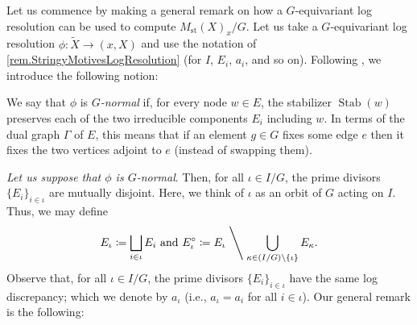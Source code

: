 \documentclass[12pt]{amsart}
\theoremstyle{plain}   %
\theoremstyle{definition}    %
\theoremstyle{remark}    %
\numberwithin{equation}{theorem}
\DeclareMathOperator{\Stab}{{Stab}}
\begin{document}
Let us commence by making a general remark on how a $G$-equivariant log resolution can be used to compute $M_{\mathrm{st}}(X)_x/G$.
Let us take a $G$-equivariant log resolution $\phi\colon \tilde{X}\to (x,X)$ and use the notation of \autoref{rem.StringyMotivesLogResolution} (for $I$, $E_i$, $a_i$, and so on). Following \cite[Definition 5.1]{batyrevNonArchimedeanIntegralsStringy1999}, we introduce the following notion:
\begin{definition}
We say that $\phi$ is \emph{$G$-normal} if, for every node $w\in E$,
the stabilizer $\Stab(w)$ preserves each of the two irreducible components
$E_{i}$ including $w$. In terms of the dual graph $\Gamma$ of $E$, this means that if an
element $g\in G$ fixes some edge $e$ then it fixes the two vertices adjoint to $e$ (instead of swapping them). 
\end{definition}

\emph{Let us suppose that $\phi$ is $G$-normal}. Then, for all $\iota \in I/G$, the prime divisors
$\{E_{i}\}_ {i\in\iota}$ are mutually disjoint. Here, we think of $\iota$ as an orbit of $G$ acting on $I$. Thus, we may define 
\[
E_{\iota}\coloneqq\bigsqcup_{i\in\iota}E_{i}\text{ and }
E_{\iota}^{\circ}\coloneqq E_{\iota} \Biggm\backslash \bigcup_{\kappa\in(I/G)\setminus\{\iota\}}E_{\kappa}.
\]
Observe that, for all $\iota \in I/G$, the prime divisors $\{E_{i}\}_{i\in\iota}$ have the same log discrepancy; which we denote by $a_{\iota}$ (i.e., $a_{\iota} = a_i$ for all $i \in \iota$). Our general remark is the following:
\end{document}
